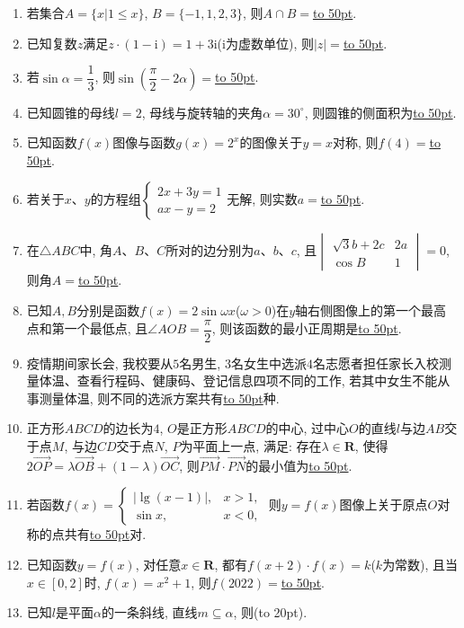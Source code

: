\documentclass[10pt,a4paper]{article}
\newcommand{\blank}[1]{\underline{\hbox to #1pt{}}}
\newcommand{\bracket}[1]{(\hbox to #1pt{})}
\begin{document}
\begin{enumerate}[1.]
\item 若集合$A=\{x|1\le x\}$, $B=\{-1,1,2,3\}$, 则$A\cap B=$\blank{50}.
\item 已知复数$z$满足$z\cdot (1-\mathrm{i})=1+3\mathrm{i}$($\mathrm{i}$为虚数单位), 则$|z|=$\blank{50}.
\item 若$\sin \alpha =\dfrac 13$, 则$\sin (\dfrac \pi 2-2\alpha)=$\blank{50}.
\item 已知圆锥的母线$l=2$, 母线与旋转轴的夹角$\alpha =30^{\circ}$, 则圆锥的侧面积为\blank{50}.
\item 已知函数$f(x)$图像与函数$g(x)=2^x$的图像关于$y=x$对称, 则$f(4)=$\blank{50}.
\item 若关于$x$、$y$的方程组$\begin{cases} 2x+3y=1 \\ ax-y=2 \end{cases}$无解, 则实数$a=$\blank{50}.
\item 在$\triangle ABC$中, 角$A$、$B$、$C$所对的边分别为$a$、$b$、$c$, 且$\begin{vmatrix}   \sqrt 3b+2c & 2a  \\\cos B & 1  \end{vmatrix}=0$, 则角$A=$\blank{50}.
\item 已知$A,B$分别是函数$f(x)=2\sin \omega x$($\omega >0$)在$y$轴右侧图像上的第一个最高点和第一个最低点, 且$\angle AOB=\dfrac\pi 2$, 则该函数的最小正周期是\blank{50}.
\item 疫情期间家长会, 我校要从$5$名男生, $3$名女生中选派$4$名志愿者担任家长入校测量体温、查看行程码、健康码、登记信息四项不同的工作, 若其中女生不能从事测量体温, 则不同的选派方案共有\blank{50}种.
\item 正方形$ABCD$的边长为$4$, $O$是正方形$ABCD$的中心, 过中心$O$的直线$l$与边$AB$交于点$M$, 与边$CD$交于点$N$, $P$为平面上一点, 满足: 存在$\lambda\in \mathbf{R}$, 使得$2\overrightarrow{OP}=\lambda \overrightarrow{OB}+(1-\lambda)\overrightarrow{OC}$, 则$\overrightarrow{PM}\cdot \overrightarrow{PN}$的最小值为\blank{50}.
\item 若函数$f(x)=\begin{cases}|\lg (x-1)|, & x>1,  \\ \sin x, &  x<0, \end{cases}$ 则$y=f(x)$图像上关于原点$O$对称的点共有\blank{50}对.
\item 已知函数$y=f(x)$, 对任意$x\in \mathbf{R}$, 都有$f(x+2)\cdot f(x)=k$($k$为常数), 且当$x\in [0,2]$时, $f(x)=x^2+1$, 则$f(2022)=$\blank{50}.
\item 已知$l$是平面$\alpha$的一条斜线, 直线$m\subseteq \alpha$, 则\bracket{20}.

\end{enumerate}
\end{document}
